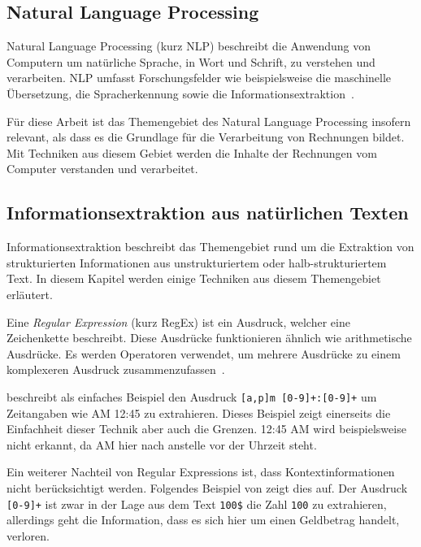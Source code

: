 \subsection{Natural Language Processing}

Natural Language Processing (kurz NLP) beschreibt die Anwendung von Computern um natürliche Sprache, in Wort und Schrift, zu verstehen und verarbeiten. NLP umfasst Forschungsfelder wie beispielsweise die maschinelle Übersetzung, die Spracherkennung sowie die Informationsextraktion~\autocite{Chowdhury2003}. 

Für diese Arbeit ist das Themengebiet des Natural Language Processing insofern relevant, als dass es die Grundlage für die Verarbeitung von Rechnungen bildet. Mit Techniken aus diesem Gebiet werden die Inhalte der Rechnungen vom Computer verstanden und verarbeitet.

\subsection{Informationsextraktion aus natürlichen Texten}
\label{chap:ner}


Informationsextraktion beschreibt das Themengebiet rund um die Extraktion von strukturierten Informationen aus unstrukturiertem oder halb-strukturiertem Text. In diesem Kapitel werden einige Techniken aus diesem Themengebiet erläutert.

Eine \textit{Regular Expression} (kurz RegEx) ist ein Ausdruck, welcher eine Zeichenkette beschreibt. Diese Ausdrücke funktionieren ähnlich wie arithmetische Ausdrücke. Es werden Operatoren verwendet, um mehrere Ausdrücke zu einem komplexeren Ausdruck zusammenzufassen~\autocite{Xiao2004}.

\textcite{Xiao2004} beschreibt als einfaches Beispiel den Ausdruck \texttt{[a,p]m [0-9]+:[0-9]+} um Zeitangaben wie AM 12:45 zu extrahieren. Dieses Beispiel zeigt einerseits die Einfachheit dieser Technik aber auch die Grenzen. 12:45 AM wird beispielsweise nicht erkannt, da AM hier nach anstelle vor der Uhrzeit steht. 

Ein weiterer Nachteil von Regular Expressions ist, dass Kontextinformationen nicht be\-rück\-sich\-tigt werden. Folgendes Beispiel von \textcite{Xiao2004} zeigt dies auf. Der Ausdruck \texttt{[0-9]+} ist zwar in der Lage aus dem Text \texttt{100\$} die Zahl \texttt{100} zu extrahieren, allerdings geht die Information, dass es sich hier um einen Geldbetrag handelt, verloren.

